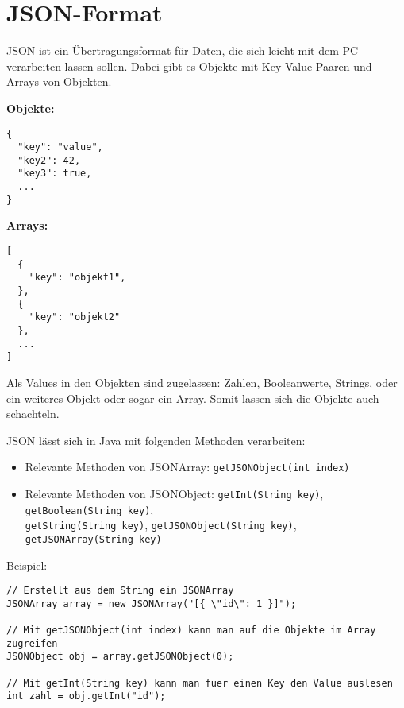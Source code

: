 \documentclass[parskip=half*]{scrartcl}
\begin{document}
\section*{JSON-Format}

JSON ist ein Übertragungsformat für Daten, die sich leicht mit dem PC verarbeiten lassen sollen. Dabei gibt es Objekte mit Key-Value Paaren und Arrays von Objekten.

\begin{minipage}[t]{0.45\linewidth}
\textbf{Objekte:}

\begin{lstlisting}[frame=single]
{
  "key": "value",
  "key2": 42,
  "key3": true,
  ...
}
\end{lstlisting}
\end{minipage}
\hspace{0.1\linewidth}
\begin{minipage}[t]{0.45\linewidth}
\textbf{Arrays:}

\begin{lstlisting}[frame=single]
[
  {
    "key": "objekt1",
  },
  {
    "key": "objekt2"
  },
  ...
]
\end{lstlisting}
\end{minipage}
Als Values in den Objekten sind zugelassen: Zahlen, Booleanwerte, Strings, oder ein weiteres Objekt oder sogar ein Array. Somit lassen sich die Objekte auch schachteln.

JSON lässt sich in Java mit folgenden Methoden verarbeiten:
\begin{itemize}
  \item Relevante Methoden von JSONArray: \lstinline{getJSONObject(int index)}
  \item Relevante Methoden von JSONObject: \lstinline{getInt(String key)}, \lstinline{getBoolean(String key)}, \\\lstinline{getString(String key)}, \lstinline{getJSONObject(String key)}, \lstinline{getJSONArray(String key)}
\end{itemize}

Beispiel:

\begin{lstlisting}
// Erstellt aus dem String ein JSONArray
JSONArray array = new JSONArray("[{ \"id\": 1 }]");

// Mit getJSONObject(int index) kann man auf die Objekte im Array zugreifen
JSONObject obj = array.getJSONObject(0);

// Mit getInt(String key) kann man fuer einen Key den Value auslesen
int zahl = obj.getInt("id");
\end{lstlisting}
\end{document}
